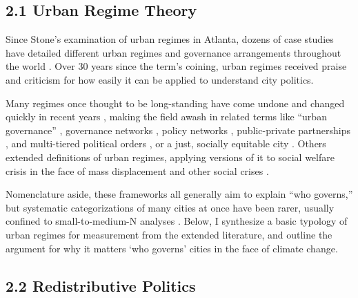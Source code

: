 \documentclass[preprint, 3p,
authoryear]{elsarticle} %
\begin{document}
\hypertarget{urban-regime-theory}{%
\subsection{2.1 Urban Regime Theory}\label{urban-regime-theory}}

Since Stone's \citeyearpar{stone_1989} examination of urban regimes in
Atlanta, dozens of case studies have detailed different urban regimes
and governance arrangements throughout the world
\citep{stoker_and_mossberger_1994, mossberger_and_stoker_2001, de_socio_2007, camou_2014, davies_and_blanco_2017, rosol_et_al_2017, russo_and_scarnato_2018}.
Over 30 years since the term's coining, urban regimes received praise
\citep{kilburn_2004, davies_and_imbroscio_2009} and criticism
\citep{sites_1997, davies_2003, imbroscio_2003, imbroscio_2004} for how
easily it can be applied to understand city politics.

Many regimes once thought to be long-standing have come undone and
changed quickly in recent years \citep{stone_2015, stone_et_al_2015},
making the field awash in related terms like ``urban governance''
\citep{pierre_2014, da_cruz_et_al_2019}, governance networks
\citep{gissendanner_2003, davidson_et_al_2019}, policy networks
\citep{bulkeley_and_betsill_2013, hawkins_et_al_2016, wukich_2022},
public-private partnerships
\citep{stoker_1998, davies_2017, guo_and_ho_2019}, and multi-tiered
political orders \citep{stone_2015, weaver_2022}, or a just, socially
equitable city \citep{campbell_1996, fainstein_2010}. Others extended
definitions of urban regimes, applying versions of it to social welfare
crisis in the face of mass displacement and other social crises
\citep{lambelet_2019}.

Nomenclature aside, these frameworks all generally aim to explain ``who
governs,'' but systematic categorizations of many cities at once have
been rarer, usually confined to small-to-medium-N analyses
\citep{sellers_2002, kilburn_2004, stone_et_al_2015, davies_and_blanco_2017}.
Below, I synthesize a basic typology of urban regimes for measurement
from the extended literature, and outline the argument for why it
matters `who governs' cities in the face of climate change.

\hypertarget{redistributive-politics}{%
\subsection{2.2 Redistributive Politics}\label{redistributive-politics}}
\end{document}
